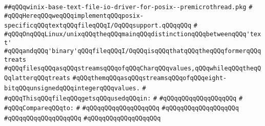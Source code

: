 \label{src/lib/std/src/io/winix-base-text-file-io-driver-for-posix--premicrothread.pkg}
\verb|##qQQqwinix-base-text-file-io-driver-for-posix--premicrothread.pkg|\newline
\verb|#|\newline
\verb|#qQQqHereqQQqweqQQqimplementqQQqposix-specificqQQqtextqQQqfileqQQqI/OqQQqsupport.qQQqqQQq|\newline
\verb|#|\newline
\verb|#qQQqOnqQQqLinux/unixqQQqtheqQQqmainqQQqdistinctionqQQqbetweenqQQq'text'|\newline
\verb|#qQQqandqQQq'binary'qQQqfileqQQqI/OqQQqisqQQqthatqQQqtheqQQqformerqQQqtreats|\newline
\verb|#qQQqfilesqQQqasqQQqstreamsqQQqofqQQqCharqQQqvalues,qQQqwhileqQQqtheqQQqlatterqQQqtreats|\newline
\verb|#qQQqthemqQQqasqQQqstreamsqQQqofqQQqeight-bitqQQqunsignedqQQqintegerqQQqvalues.|\newline
\verb|#|\newline
\verb|#qQQqThisqQQqfileqQQqgetsqQQqusedqQQqin:|\newline
\verb|#|\newline
\verb|#qQQqqQQqqQQqqQQqqQQq|\newline
\verb|#|\newline
\verb|#qQQqCompareqQQqto:|\newline
\verb|#|\newline
\verb|#qQQqqQQqqQQqqQQqqQQq|\newline
\verb|#qQQqqQQqqQQqqQQqqQQq|\newline
\verb|#qQQqqQQqqQQqqQQqqQQq|\newline
\verb|#qQQqqQQqqQQqqQQqqQQq|\newline
